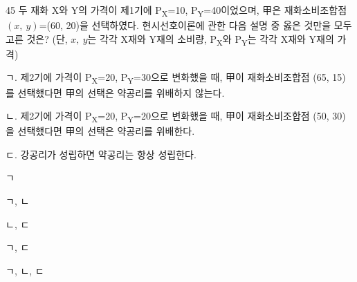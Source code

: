 \begin{question}{45}
두 재화 X와 Y의 가격이 제1기에 P\textsubscript{X}=10, P\textsubscript{Y}=40이었으며, 甲은 재화소비조합점 $(x,~y)$=(60, 20)을 선택하였다. 현시선호이론에 관한 다음 설명 중 옳은 것만을 모두 고른 것은? (단, $x,~y$는 각각 X재와 Y재의 소비량, P\textsubscript{X}와 P\textsubscript{Y}는 각각 X재와 Y재의 가격)
\begin{framedtext}
ㄱ. 제2기에 가격이 P\textsubscript{X}=20, P\textsubscript{Y}=30으로 변화했을 때, 甲이 재화소비조합점 (65, 15)를 선택했다면 甲의 선택은 약공리를 위배하지 않는다. \par
ㄴ. 제2기에 가격이 P\textsubscript{X}=20, P\textsubscript{Y}=20으로 변화했을 때, 甲이 재화소비조합점 (50, 30)을 선택했다면 甲의 선택은 약공리를 위배한다. \par
ㄷ. 강공리가 성립하면 약공리는 항상 성립한다.
\end{framedtext}
\begin{choices}
  \item ㄱ
  \item ㄱ, ㄴ
  \item ㄴ, ㄷ
  \item ㄱ, ㄷ
  \item ㄱ, ㄴ, ㄷ
\end{choices}
\end{question}
